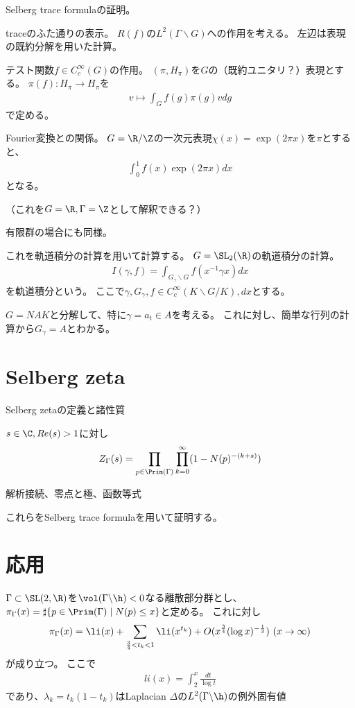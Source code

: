 \documentclass{jsarticle}
\begin{document}
Selberg trace formulaの証明。

traceのふた通りの表示。
$R(f)$の$L^2(\Gamma\backslash G)$への作用を考える。
左辺は表現の既約分解を用いた計算。

テスト関数$f\in C^\infty_c(G)$の作用。
$(\pi, H_\pi)$を$G$の（既約ユニタリ？）表現とする。
$\pi(f):H_\pi \to H_\pi$を
\begin{align*}
v\mapsto\int_Gf(g)\pi(g)vdg
\end{align*}
で定める。

Fourier変換との関係。
$G=\R/\Z$の一次元表現$\chi(x)=\exp(2\pi x)$を$\pi$とすると、
\begin{align*}
\int_0^1f(x)\exp(2\pi x)dx
\end{align*}
となる。

（これを$G=\R, \Gamma=\Z$として解釈できる？）

有限群の場合にも同様。



これを軌道積分の計算を用いて計算する。
$G=\SL_2(\R)$の軌道積分の計算。
\begin{align*}
I(\gamma,f)=\int_{G_\gamma\backslash G}f(x^{-1}\gamma x)dx
\end{align*}
を軌道積分という。
ここで$\gamma, G_\gamma, f\in C^\infty_c(K\backslash G/K), dx$とする。

$G=NAK$と分解して、特に$\gamma=a_t\in A$を考える。
これに対し、簡単な行列の計算から$G_\gamma =A$とわかる。

\section{Selberg zeta}
Selberg zetaの定義と諸性質
\begin{dfn}
$s\in\C, Re(s)>1$に対し
\begin{align*}
Z_\Gamma(s)=\prod_{p \in\Prim(\Gamma)}\prod^\infty_{k=0}(1-N(p)^{-(k+s)})
\end{align*}
\end{dfn}

解析接続、零点と極、函数等式

これらをSelberg trace formulaを用いて証明する。
\section{応用}
\begin{thm}[素測地線定理]
$\Gamma\subset \SL(2,\R)$を$\vol(\Gamma\backslash\h)<0$なる離散部分群とし、
$\pi_\Gamma(x)=\sharp\{p\in \Prim(\Gamma)\mid N(p)\leq x\}$と定める。
これに対し
\begin{align*}
\pi_\Gamma(x)=\li(x)+\sum_{\frac{3}{4}<t_k<1}\li(x^{t_k})+O(x^{\frac{3}{4}}(\log x)^{-\frac{1}{2}})~(x\to \infty)
\end{align*}
が成り立つ。
ここで
\begin{align*}
li(x)=\int^x_2\frac{dt}{\log t}
\end{align*}
であり、$\lambda_k=t_k(1-t_k)$はLaplacian $\Delta$の$L^2(\Gamma\backslash\h)$の例外固有値
\end{thm}
\end{document}

